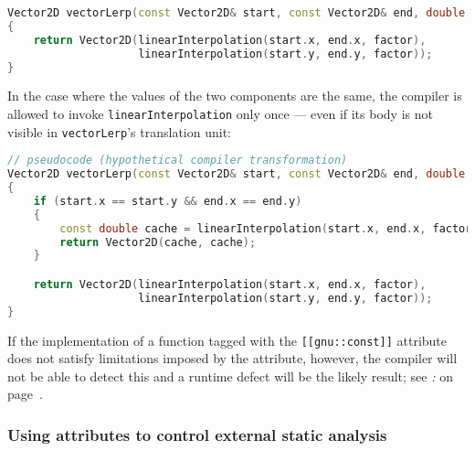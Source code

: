 \begin{lstlisting}[language=C++]
Vector2D vectorLerp(const Vector2D& start, const Vector2D& end, double factor)
{
    return Vector2D(linearInterpolation(start.x, end.x, factor),
                    linearInterpolation(start.y, end.y, factor));
}
\end{lstlisting}

\noindent In the case where the values of the two components
are the same, the compiler is allowed to invoke
\texttt{linearInterpolation} only once --- even if its body is not
visible in \texttt{vectorLerp}'s translation unit:

\begin{lstlisting}[language=C++]
// pseudocode (hypothetical compiler transformation)
Vector2D vectorLerp(const Vector2D& start, const Vector2D& end, double factor)
{
    if (start.x == start.y && end.x == end.y)
    {
        const double cache = linearInterpolation(start.x, end.x, factor);
        return Vector2D(cache, cache);
    }

    return Vector2D(linearInterpolation(start.x, end.x, factor),
                    linearInterpolation(start.y, end.y, factor));
}
\end{lstlisting}

\noindent If the implementation of a function tagged with the
\texttt{[[gnu::const]]} attribute does not satisfy limitations imposed by
the attribute, however, the compiler will not be able to detect this and a runtime
defect will be the likely result;
  see
{\it{}:} {\it{}} on page~\pageref{some-attributes,-if-misused,-can-affect-program-correctness}.

\subsubsection[Using attributes to control external static analysis]{Using attributes to control external static analysis}\label{using-attributes-to-control-external-static-analysis}


